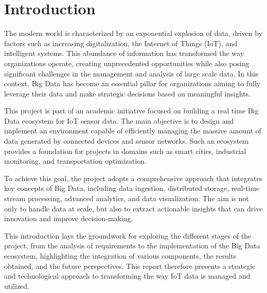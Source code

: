\chapter*{Introduction}

The modern world is characterized by an exponential explosion of data,
driven by factors such as increasing digitalization, the Internet of
Things (IoT), and intelligent systems. This abundance of information
has transformed the way organizations operate, creating unprecedented
opportunities while also posing significant challenges in the
management and analysis of large scale data. In this context, Big Data
has become an essential pillar for organizations aiming to fully
leverage their data and make strategic decisions based on meaningful
insights.

This project is part of an academic initiative focused on building a
real time Big Data ecosystem for IoT sensor data. The main objective
is to design and implement an environment capable of efficiently
managing the massive amount of data generated by connected devices and
sensor networks. Such an ecosystem provides a foundation for projects
in domains such as smart cities, industrial monitoring, and
transportation optimization.

To achieve this goal, the project adopts a comprehensive approach that
integrates key concepts of Big Data, including data ingestion,
distributed storage, real-time stream processing, advanced analytics,
and data visualization. The aim is not only to handle data at scale,
but also to extract actionable insights that can drive innovation and
improve decision-making.

This introduction lays the groundwork for exploring the different
stages of the project, from the analysis of requirements to the
implementation of the Big Data ecosystem, highlighting the integration
of various components, the results obtained, and the future
perspectives. This report therefore presents a strategic and
technological approach to transforming the way IoT data is managed and
utilized.

